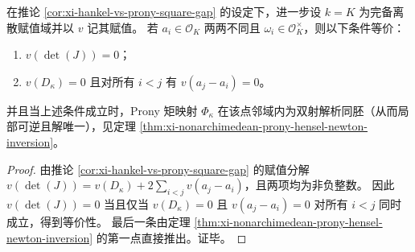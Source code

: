 \begin{corollary}\label{cor:xi-nonarchimedean-prony-unit-jacobian-criterion}
在推论 \ref{cor:xi-hankel-vs-prony-square-gap} 的设定下，进一步设 \(k=K\) 为完备离散赋值域并以 \(v\) 记其赋值。
若 \(a_i\in\mathcal O_K\) 两两不同且 \(\omega_i\in\mathcal O_K^\times\)，则以下条件等价：
\begin{enumerate}
  \item \(v(\det(J))=0\)；
  \item \(v(D_\kappa)=0\) 且对所有 \(i<j\) 有 \(v(a_j-a_i)=0\)。
\end{enumerate}
并且当上述条件成立时，Prony 矩映射 \(\Phi_\kappa\) 在该点邻域内为双射解析同胚（从而局部可逆且解唯一），见定理 \ref{thm:xi-nonarchimedean-prony-hensel-newton-inversion}。
\end{corollary}
\begin{proof}
由推论 \ref{cor:xi-hankel-vs-prony-square-gap} 的赋值分解
\(
v(\det(J))=v(D_\kappa)+2\sum_{i<j}v(a_j-a_i)
\)，且两项均为非负整数。
因此 \(v(\det(J))=0\) 当且仅当 \(v(D_\kappa)=0\) 且 \(v(a_j-a_i)=0\) 对所有 \(i<j\) 同时成立，得到等价性。
最后一条由定理 \ref{thm:xi-nonarchimedean-prony-hensel-newton-inversion} 的第一点直接推出。证毕。
\end{proof}
